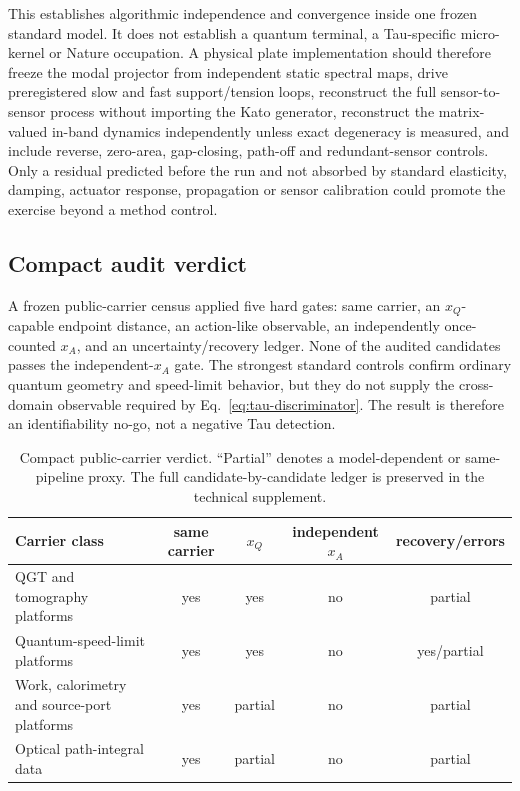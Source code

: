 \documentclass[11pt]{article}
\begin{document}
This establishes algorithmic independence and convergence inside one frozen
standard model.  It does not establish a quantum terminal, a Tau-specific
micro-kernel or Nature occupation.  A physical plate implementation should
therefore freeze the modal projector from independent static spectral maps,
drive preregistered slow and fast support/tension loops, reconstruct the full
sensor-to-sensor process without importing the Kato generator, reconstruct
the matrix-valued in-band dynamics independently unless exact degeneracy is
measured, and include
reverse, zero-area, gap-closing, path-off and redundant-sensor controls.  Only
a residual predicted before the run and not absorbed by standard elasticity,
damping, actuator response, propagation or sensor calibration could promote
the exercise beyond a method control.

\subsection{Compact audit verdict}

A frozen public-carrier census applied five hard gates: same carrier, an
$x_Q$-capable endpoint distance, an action-like observable, an independently
once-counted $x_A$, and an uncertainty/recovery ledger.  None of the audited
candidates passes the independent-$x_A$ gate.  The strongest standard controls
confirm ordinary quantum geometry and speed-limit behavior, but they do not
supply the cross-domain observable required by
Eq.~\eqref{eq:tau-discriminator}.  The result is therefore an identifiability
no-go, not a negative Tau detection.

\begin{table}[ht]
\centering
\small
\caption{Compact public-carrier verdict.  ``Partial'' denotes a model-dependent
or same-pipeline proxy.  The full candidate-by-candidate ledger is preserved in
the technical supplement.}
\label{tab:public-census}
\begin{tabularx}{\textwidth}{@{}Xcccc@{}}
\toprule
Carrier class & same carrier & $x_Q$ & independent $x_A$ & recovery/errors\\
\midrule
QGT and tomography platforms & yes & yes & no & partial\\
Quantum-speed-limit platforms & yes & yes & no & yes/partial\\
Work, calorimetry and source-port platforms & yes & partial & no & partial\\
Optical path-integral data & yes & partial & no & partial\\
\bottomrule
\end{tabularx}
\end{table}
\end{document}
